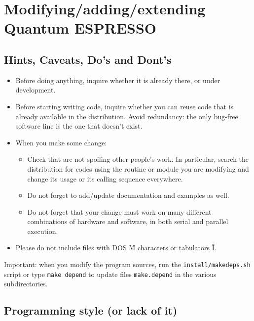 \documentclass[12pt,a4paper]{article}
\def\qe{{\sc Quantum ESPRESSO}}
\begin{document}
\section{ Modifying/adding/extending \qe}
\subsection{Hints, Caveats, Do's and Dont's}

\begin{itemize}
\item Before doing anything, inquire whether it is already there, or under development.
\item Before starting writing code, inquire whether you can reuse code that is already available in the distribution. Avoid redundancy: the only bug-free software line is the one that doesn't exist.
\item When you make some change:
\begin{itemize}
\item Check that are not spoiling other people's work. In particular, search the distribution for codes using the routine or module you are modifying and change its usage or its calling sequence everywhere.
\item Do not forget to add/update documentation and examples as well.
\item Do not forget that your change must work on many different combinations of hardware and software, in both serial and parallel execution.
\end{itemize}
\item Please do not include files with DOS \^M characters or 
tabulators \^I.
\end{itemize}
Important: when you modify the program sources, run the
\texttt{install/makedeps.sh}  script  or type \texttt{make depend} 
to update files \texttt{make.depend} in the various 
subdirectories.

\subsection{Programming style (or lack of it)}
\end{document}
